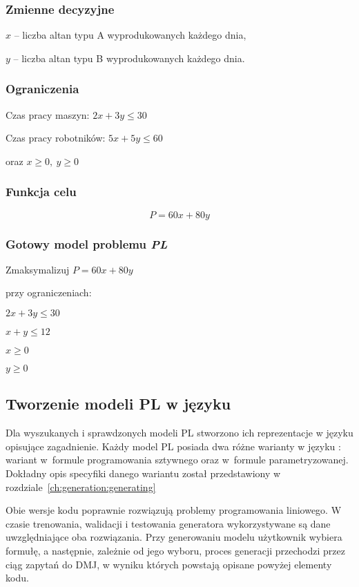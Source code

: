 \subsubsection*{Zmienne decyzyjne}

$x$ – liczba altan typu A wyprodukowanych każdego dnia,

$y$ – liczba altan typu B wyprodukowanych każdego dnia.

\subsubsection*{Ograniczenia}

Czas pracy maszyn: $2x + 3y \leq 30$

Czas pracy robotników: $5x + 5y \leq 60$

oraz $x \geq 0, \ y \geq 0$


\subsubsection*{Funkcja celu}
\[
    P = 60x + 80y
\]

\subsubsection*{Gotowy model problemu \textit{PL}}
    Zmaksymalizuj $P = 60x + 80y$

przy ograniczeniach:

    $2x + 3y \leq 30$
    
    $x + y \leq 12$
    
    $x  \geq 0$
    
    $y \geq 0$


\subsection{Tworzenie modeli PL w języku }

Dla wyszukanych i sprawdzonych modeli PL stworzono ich reprezentacje w języku  opisujące zagadnienie. %
Każdy model PL posiada dwa różne warianty w języku  : wariant w~formule programowania sztywnego oraz w~formule parametryzowanej. Dokładny opis specyfiki danego wariantu został przedstawiony w rozdziale~\ref{ch:generation:generating}

Obie wersje kodu poprawnie rozwiązują problemy programowania liniowego. W czasie trenowania, walidacji i testowania generatora wykorzystywane są dane uwzględniające oba rozwiązania. Przy generowaniu modelu  użytkownik wybiera formułę, a następnie, zależnie od jego wyboru, proces generacji przechodzi przez ciąg zapytań do DMJ, w wyniku których powstają opisane powyżej elementy kodu. %

